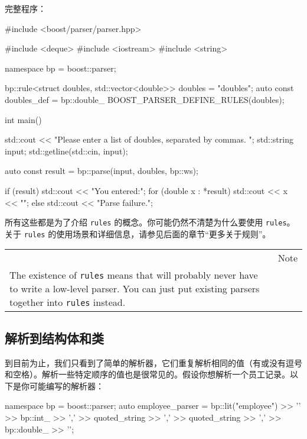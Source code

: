 完整程序：

\begin{code}
#include <boost/parser/parser.hpp>

#include <deque>
#include <iostream>
#include <string>


namespace bp = boost::parser;


bp::rule<struct doubles, std::vector<double>> doubles = "doubles";
auto const doubles_def = bp::double_ %
BOOST_PARSER_DEFINE_RULES(doubles);

int main()
{
    std::cout << "Please enter a list of doubles, separated by commas. ";
    std::string input;
    std::getline(std::cin, input);

    auto const result = bp::parse(input, doubles, bp::ws);

    if (result) {
        std::cout << "You entered:\n";
        for (double x : *result) {
            std::cout << x << "\n";
        }
    } else {
        std::cout << "Parse failure.\n";
    }
}
\end{code}

所有这些都是为了介绍 \texttt{rules} 的概念。你可能仍然不清楚为什么要使用 \texttt{rules}。关于 \texttt{rules} 的使用场景和详细信息，请参见后面的章节“更多关于规则”。

\begin{longtable}[]{@{}
  >{\raggedright\arraybackslash}p{}
  >{\raggedright\arraybackslash}p{}@{}}
\toprule\noalign{}
\endhead
\bottomrule\noalign{}
\endlastfoot
\begin{minipage}[t]{\linewidth}\raggedright
\end{minipage} & Note \\
The existence of \texttt{rules} means that will probably never have to write a low-level parser. You can just put existing parsers together into \texttt{rules} instead. & \\
\end{longtable}

\subsection{解析到结构体和类}

到目前为止，我们只看到了简单的解析器，它们重复解析相同的值（有或没有逗号和空格）。解析一些特定顺序的值也是很常见的。假设你想解析一个员工记录。以下是你可能编写的解析器：
\begin{code}
namespace bp = boost::parser;
auto employee_parser = bp::lit("employee")
    >> '{'
    >> bp::int_ >> ','
    >> quoted_string >> ','
    >> quoted_string >> ','
    >> bp::double_
    >> '}';
\end{code}


